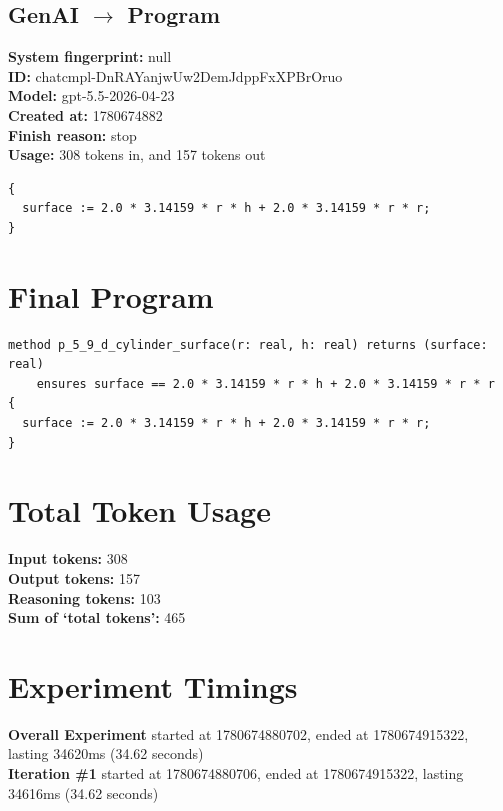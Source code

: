 \documentclass{article}
\begin{document}
\subsection*{GenAI $\rightarrow$ Program}
\textbf{System fingerprint: }null
\\\textbf{ID: }chatcmpl-DnRAYanjwUw2DemJdppFxXPBrOruo
\\\textbf{Model: }gpt-5.5-2026-04-23
\\\textbf{Created at: }1780674882
\\\textbf{Finish reason: }stop
\\\textbf{Usage: }308 tokens in, and 157 tokens out
\begin{lstlisting}
{
  surface := 2.0 * 3.14159 * r * h + 2.0 * 3.14159 * r * r;
}
\end{lstlisting}
\section*{Final Program}
\begin{lstlisting}
method p_5_9_d_cylinder_surface(r: real, h: real) returns (surface: real)
	ensures surface == 2.0 * 3.14159 * r * h + 2.0 * 3.14159 * r * r
{
  surface := 2.0 * 3.14159 * r * h + 2.0 * 3.14159 * r * r;
}
\end{lstlisting}
\section*{Total Token Usage}
\textbf{Input tokens: }308
\\\textbf{Output tokens: }157
\\\textbf{Reasoning tokens: }103
\\\textbf{Sum of `total tokens': }465
\section*{Experiment Timings}
\textbf{Overall Experiment} started at 1780674880702, ended at 1780674915322, lasting 34620ms (34.62 seconds)
\\\textbf{Iteration \#1} started at 1780674880706, ended at 1780674915322, lasting 34616ms (34.62 seconds)
\end{document}
